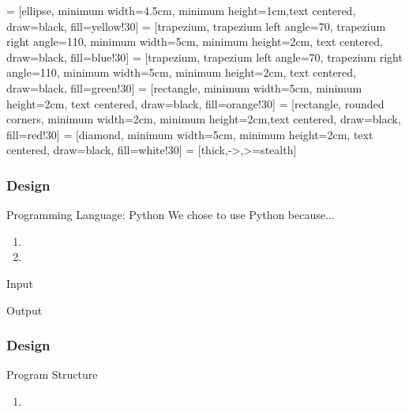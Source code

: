  = [ellipse, minimum width=4.5cm, minimum height=1cm,text centered, draw=black, fill=yellow!30]
 = [trapezium, trapezium left angle=70, trapezium right angle=110, minimum width=5cm, minimum height=2cm, text centered, draw=black, fill=blue!30]
 = [trapezium, trapezium left angle=70, trapezium right angle=110, minimum width=5cm, minimum height=2cm, text centered, draw=black, fill=green!30]
 = [rectangle, minimum width=5cm, minimum height=2cm, text centered, draw=black, fill=orange!30]
 = [rectangle, rounded corners, minimum width=2cm, minimum height=2cm,text centered, draw=black, fill=red!30]
 = [diamond, minimum width=5cm, minimum height=2cm, text centered, draw=black, fill=white!30]
 = [thick,->,>=stealth]

\begin{frame}
	\centering
	\frametitle{Design}

	\begin{block}{Programming Language: Python}
	We chose to use Python because...
		\begin{enumerate}
			\item 
			\item 
		\end{enumerate}	
	\end{block}
	
	\pause
	
	\begin{block}{Input}
	\end{block}
	
	\pause
	
	\begin{block}{Output}
	\end{block}
	
\end{frame}

\begin{frame}
	\centering
	\frametitle{Design}
	\begin{block}{Program Structure}
		\begin{enumerate}
			\item 
		\end{enumerate}	
	\end{block}	
\end{frame}


